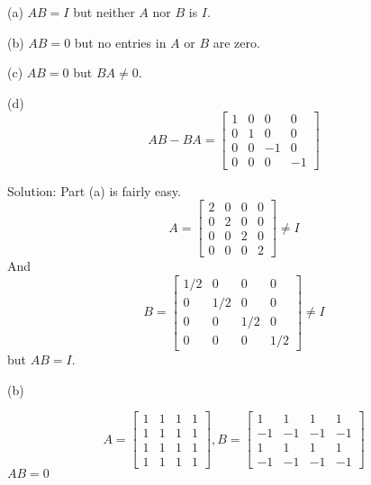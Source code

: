 \documentclass[16 pt]{amsart}
\theoremstyle{definition}
\theoremstyle{remark}
\numberwithin{equation}{subsection}
\begin{document}
\vspace{.25in}

(a) $AB = I$ but neither $A$ nor $B$ is $I$.

\vspace{.25in}

(b) $AB = 0$ but no entries in $A$ or $B$ are zero.

\vspace{.25in}

(c) $AB=0$ but $BA \ne 0$.

\vspace{.25in}

(d) 
\[
AB - BA = \begin{bmatrix}
1 & 0 & 0 & 0\\
0 & 1 & 0 & 0\\
0 & 0 & -1 & 0\\
0 & 0 & 0 & -1
\end{bmatrix}
\]

\vspace{.5in}

Solution: Part (a) is fairly easy.
\[
A = \begin{bmatrix}
2 & 0 & 0 & 0 \\
0 & 2 & 0 & 0 \\
0 & 0 & 2 & 0 \\
0 & 0 & 0 & 2
\end{bmatrix} \ne I
\]
And
\[
B = \begin{bmatrix}
1/2 & 0 & 0 & 0 \\
0 & 1/2 & 0 & 0 \\
0 & 0 & 1/2 & 0 \\
0 & 0 & 0 & 1/2
\end{bmatrix} \ne I
\]
but $AB=I$. 

\vspace{.25in}

(b) 

\[
A = \begin{bmatrix}
1 & 1 & 1 & 1 \\
1 & 1 & 1 & 1 \\
1 & 1 & 1 & 1 \\
1 & 1 & 1 & 1
\end{bmatrix},
B = \begin{bmatrix}
1 & 1 & 1 & 1 \\
-1 & -1 & -1 & -1 \\
1 & 1 & 1 & 1 \\
-1 & -1 & -1 & -1 
\end{bmatrix} 
\]
$AB = 0$
\end{document}
